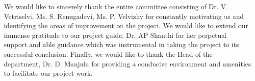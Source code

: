 We would like to sincerely thank the entire committee consisting of
Dr. V. Vetriselvi, Ms. S. Renugadevi, Ms. P. Velvizhy for constantly motivating us and identifying the areas of improvement on the project. We would like to extend our immense gratitude to our project guide, Dr. AP Shanthi for her perpetual support and able guidance which was instrumental in taking the project to its successful conclusion. Finally, we would like to thank the Head of the department, Dr. D. Manjula for providing a conducive environment and amenities to facilitate our project work.